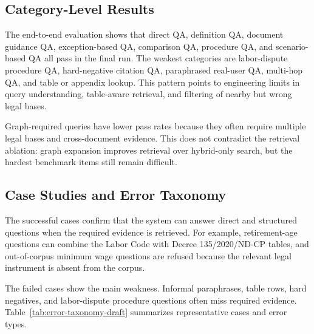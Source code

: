 \subsection{Category-Level Results}
The end-to-end evaluation shows that direct QA, definition QA, document guidance QA, exception-based QA, comparison QA, procedure QA, and scenario-based QA all pass in the final run. The weakest categories are labor-dispute procedure QA, hard-negative citation QA, paraphrased real-user QA, multi-hop QA, and table or appendix lookup. This pattern points to engineering limits in query understanding, table-aware retrieval, and filtering of nearby but wrong legal bases.

Graph-required queries have lower pass rates because they often require multiple legal bases and cross-document evidence. This does not contradict the retrieval ablation: graph expansion improves retrieval over hybrid-only search, but the hardest benchmark items still remain difficult.

\subsection{Case Studies and Error Taxonomy}
The successful cases confirm that the system can answer direct and structured questions when the required evidence is retrieved. For example, retirement-age questions can combine the Labor Code with Decree 135/2020/ND-CP tables, and out-of-corpus minimum wage questions are refused because the relevant legal instrument is absent from the corpus.

The failed cases show the main weakness. Informal paraphrases, table rows, hard negatives, and labor-dispute procedure questions often miss required evidence. Table~\ref{tab:error-taxonomy-draft} summarizes representative cases and error types.

